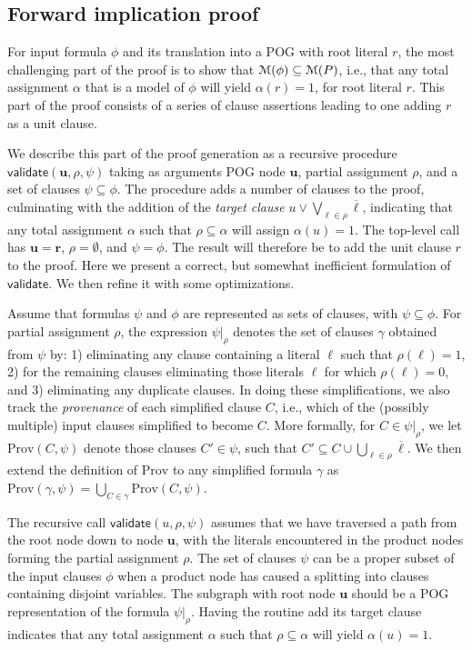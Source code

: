 \documentclass[letterpaper,USenglish,cleveref, autoref, thm-restate]{lipics-v2021}
\newcommand{\obar}[1]{\overline{#1}}
\newcommand{\lit}{\ell}
\newcommand{\assign}{\alpha}
\newcommand{\passign}{\rho}
\newcommand{\modelset}{{\cal M}}
\newcommand{\validate}{\textsf{validate}}
\newcommand{\prov}{\textrm{Prov}}
\newcommand{\makenode}[1]{\mathbf{#1}}
\newcommand{\nodeu}{\makenode{u}}
\newcommand{\noder}{\makenode{r}}
\newcommand{\simplify}[2]{#1|_{#2}}
\begin{document}
\subsection{Forward implication proof}

For input formula $\phi$ and its translation into a POG with root literal
$r$, the most challenging part of the proof is to show that
$\modelset(\phi) \subseteq \modelset(P)$, i.e., that any total
assignment $\alpha$ that is a model of $\phi$ will yield $\assign(r) =
1$, for root literal $r$.
This part of the proof consists of a series of clause assertions
leading to one adding $r$ as a unit clause.

We describe this part of the proof generation as a recursive procedure
$\validate(\nodeu, \passign, \psi)$ taking as arguments POG
node $\nodeu$, partial assignment
$\passign$, and a set of clauses $\psi \subseteq \phi$.
The procedure adds a number of clauses to the proof, culminating with
the addition of the {\em target clause}
$u \lor \bigvee_{\lit \in \passign} \obar{\lit}$, indicating that any total
assignment $\assign$ such that $\passign \subseteq \assign$
will assign $\assign(u) = 1$.
The top-level call has $\nodeu = \noder$, $\passign = \emptyset$, and $\psi = \phi$.
The result will therefore be to add the unit clause $r$ to the proof.
Here we present a correct, but somewhat inefficient formulation of
$\validate$.  We then refine it with some optimizations.

Assume that formulas $\psi$ and $\phi$ are
represented as sets of clauses, with $\psi \subseteq \phi$.
For partial assignment
$\passign$, the expression  $\simplify{\psi}{\passign}$ denotes the set of clauses $\gamma$
obtained from $\psi$ by: 1) eliminating any
clause containing a literal $\lit$ such that $\passign(\lit) = 1$,
2) for the remaining clauses eliminating those literals $\lit$ for
which $\passign(\lit) = 0$, and 3) eliminating any duplicate clauses.
In doing these simplifications, we also track the {\em provenance}
of each simplified clause $C$, i.e., which of the (possibly multiple) input clauses simplified to become $C$.
More formally, for $C \in \simplify{\psi}{\passign}$, we let $\prov(C, \psi)$ denote
those clauses $C' \in \psi$, such that
$C' \subseteq C \cup \bigcup_{\lit \in \passign} \obar{\lit}$.
We then extend the definition of $\prov$ to any simplified formula
$\gamma$ as $\prov(\gamma, \psi) = \bigcup_{C \in \gamma} \prov(C, \psi)$.

The recursive call $\validate(u, \passign, \psi)$ assumes that we have
traversed a path from the root node down to node $\nodeu$, with the
literals encountered in the product nodes forming the partial
assignment $\passign$.  The set of clauses $\psi$ can be a proper
subset of the input clauses $\phi$ when a product node has caused
a splitting into clauses containing disjoint variables.
The subgraph with root node $\nodeu$ should be a POG representation of the formula
$\simplify{\psi}{\passign}$.  Having the
routine add its target clause indicates that any total assignment
$\assign$ such that $\passign \subseteq \assign$ will yield $\alpha(u) = 1$.
\end{document}
